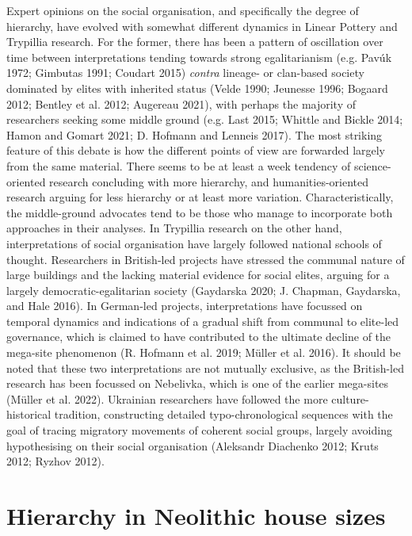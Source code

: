 \documentclass[
  12pt,
  a4paper, twoside]{book}
\begin{document}
Expert opinions on the social organisation, and specifically the degree of hierarchy, have evolved with somewhat different dynamics in Linear Pottery and Trypillia research. For the former, there has been a pattern of oscillation over time between interpretations tending towards strong egalitarianism (e.g. Pavúk 1972; Gimbutas 1991; Coudart 2015) \emph{contra} lineage- or clan-based society dominated by elites with inherited status (Velde 1990; Jeunesse 1996; Bogaard 2012; Bentley et al. 2012; Augereau 2021), with perhaps the majority of researchers seeking some middle ground (e.g. Last 2015; Whittle and Bickle 2014; Hamon and Gomart 2021; D. Hofmann and Lenneis 2017). The most striking feature of this debate is how the different points of view are forwarded largely from the same material. There seems to be at least a week tendency of science-oriented research concluding with more hierarchy, and humanities-oriented research arguing for less hierarchy or at least more variation. Characteristically, the middle-ground advocates tend to be those who manage to incorporate both approaches in their analyses. In Trypillia research on the other hand, interpretations of social organisation have largely followed national schools of thought. Researchers in British-led projects have stressed the communal nature of large buildings and the lacking material evidence for social elites, arguing for a largely democratic-egalitarian society (Gaydarska 2020; J. Chapman, Gaydarska, and Hale 2016). In German-led projects, interpretations have focussed on temporal dynamics and indications of a gradual shift from communal to elite-led governance, which is claimed to have contributed to the ultimate decline of the mega-site phenomenon (R. Hofmann et al. 2019; Müller et al. 2016). It should be noted that these two interpretations are not mutually exclusive, as the British-led research has been focussed on Nebelivka, which is one of the earlier mega-sites (Müller et al. 2022). Ukrainian researchers have followed the more culture-historical tradition, constructing detailed typo-chronological sequences with the goal of tracing migratory movements of coherent social groups, largely avoiding hypothesising on their social organisation (Aleksandr Diachenko 2012; Kruts 2012; Ryzhov 2012).

\hypertarget{hierarchy-in-neolithic-house-sizes}{%
\section{Hierarchy in Neolithic house sizes}\label{hierarchy-in-neolithic-house-sizes}}
\end{document}
